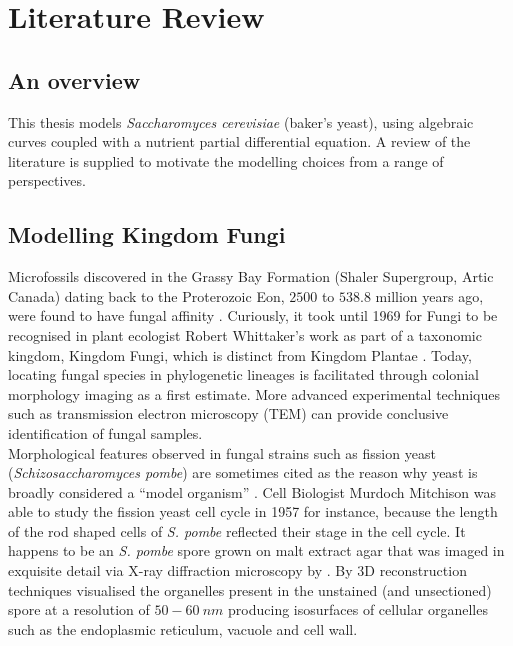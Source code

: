 \chapter{Literature Review}

\section{An overview}
This thesis models \textit{Saccharomyces cerevisiae} (baker's yeast), using algebraic curves 
coupled with a nutrient partial differential equation. A review of the literature is supplied 
to motivate the modelling choices from a range of perspectives.

\section{Modelling Kingdom Fungi}

Microfossils discovered in the Grassy Bay Formation 
(Shaler Supergroup, Artic Canada) dating back to the Proterozoic Eon, $2500$ to $538.8$ million years ago, were 
found to have fungal affinity \cite{loron2019early}. Curiously, it took until 1969 for Fungi to be 
recognised in plant ecologist Robert Whittaker's work as part of a taxonomic kingdom, Kingdom Fungi,
which is distinct from Kingdom Plantae \cite{whittaker1969new}. Today, locating fungal species 
in phylogenetic lineages is facilitated through colonial morphology imaging as a first 
estimate. More advanced experimental techniques such as transmission 
electron microscopy (TEM) can provide  
conclusive identification \cite{loron2019early} of fungal samples.
\\

Morphological features observed in fungal strains such as fission yeast 
(\textit{Schizosaccharomyces pombe}) are sometimes cited as the reason 
why yeast is broadly considered a ``model organism'' \cite{hayles2018introduction}.
Cell Biologist Murdoch Mitchison was able to study the fission yeast cell cycle in 1957 for instance,
because the length of the rod shaped cells of \textit{S. pombe} reflected their stage in the cell cycle.
It happens to be an \textit{S. pombe} spore grown on malt extract agar that was imaged in exquisite detail via 
X-ray diffraction microscopy by \cite{jiang2010quantitative}. By 3D 
reconstruction techniques \cite{jiang2010quantitative} visualised the organelles
present in the unstained (and unsectioned) spore at a resolution of $50-60 \ nm$ 
producing isosurfaces of cellular organelles such as the endoplasmic reticulum, 
vacuole and cell wall.
\\

